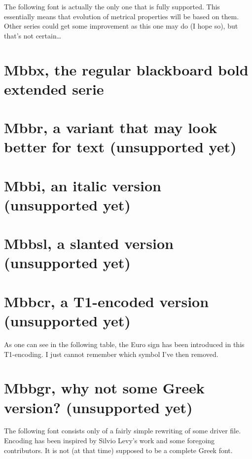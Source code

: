 The following font is actually the only one that is fully supported.
This essentially means that evolution of metrical properties will be
based on them. Other series could get some improvement as this one
may do (I hope so), but that's not certain\dots


\section{Mbbx, the regular blackboard bold extended serie}


\section{Mbbr, a variant that may look better for text (unsupported yet)}


\section{Mbbi, an italic version (unsupported yet)}


\section{Mbbsl, a slanted version (unsupported yet)}


\section{Mbbcr, a T1-encoded version (unsupported yet)}

As one can see in the following table, the Euro sign has
been introduced in this T1-encoding. I just cannot
remember which symbol I've then removed.


\section{Mbbgr, why not some Greek version? (unsupported yet)}

The following font consists only of a
fairly simple rewriting of some driver
file. Encoding has been inspired by
Silvio Levy's work and some foregoing
contributors. It is not
(at that time) supposed to be a complete
Greek font.

